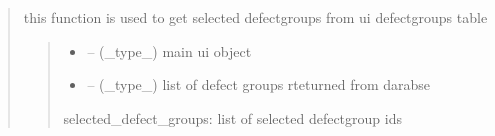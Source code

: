 \documentclass[letterpaper,10pt,english]{sphinxmanual}
\begin{document}
\begin{quote}
\begin{savenotes}
\begin{fulllineitems}
\begin{quote}
\begin{description}
\end{description}\end{quote}

\end{fulllineitems}\end{savenotes}


\begin{savenotes}\begin{fulllineitems}
\label{\detokenize{setting/backend/defect_management_funcs:oxin.backend.defect_management_funcs.get_selected_defect_groups}}
\pysigstartsignatures
{}
\pysigstopsignatures
\sphinxAtStartPar
this function is used to get selected defect\sphinxhyphen{}groups from ui defect\sphinxhyphen{}groups table
\begin{quote}\begin{description}
\begin{itemize}
\item {} 
\sphinxAtStartPar
{} – (\_type\_) main ui object

\item {} 
\sphinxAtStartPar
{} – (\_type\_) list of defect groups rteturned from darabse

\end{itemize}

\sphinxAtStartPar
selected\_defect\_groups: list of selected defect\sphinxhyphen{}group ids

\end{description}\end{quote}

\end{fulllineitems}\end{savenotes}



\end{quote}
\end{document}

